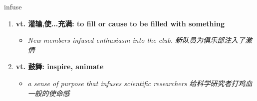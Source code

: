 
\begin{frame}
{\huge infuse}
\begin{center}
\begin{enumerate}\Large
  \item \textbf{vt. 灌输,使...充满: to fill or cause to be filled with something}
  \begin{itemize}
    \item \em{\Large{New members infused enthusiasm into the club. 新队员为俱乐部注入了激情}}
  \end{itemize}
  \item \textbf{vt. 鼓舞: inspire, animate}
  \begin{itemize}
    \item \em{\Large{a sense of purpose that infuses scientific researchers 给科学研究者打鸡血一般的使命感}}
  \end{itemize}
\end{enumerate}
\end{center}
\end{frame}
